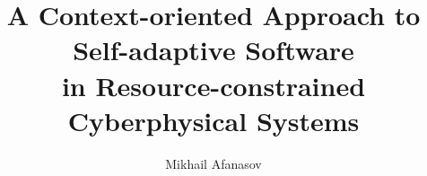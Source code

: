 \documentclass{sig-alternate}
\begin{document}
\title{A Context-oriented Approach to Self-adaptive Software\\ in Resource-constrained Cyberphysical Systems}


\author{
%
%
\alignauthor
Mikhail Afanasov \\
       \\
}


\maketitle













{\small
}
\end{document}
